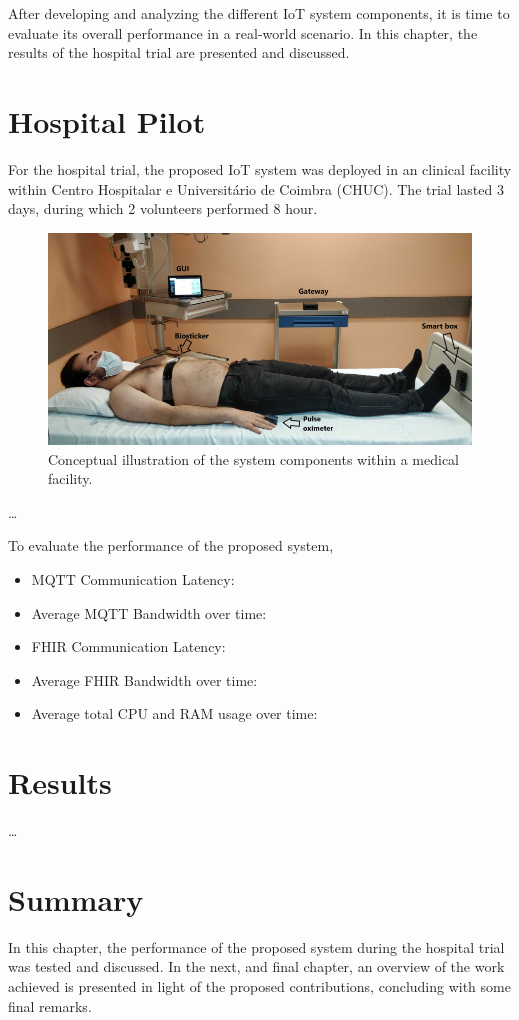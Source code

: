 After developing and analyzing the different \acs{IoT} system components, it is time to evaluate its overall performance in a real-world scenario. In this chapter, the results of the hospital trial are presented and discussed. 

\section{Hospital Pilot}

For the hospital trial, the proposed \acs{IoT} system was deployed in an clinical facility within Centro Hospitalar e Universitário de Coimbra (CHUC). The trial lasted 3 days, during which 2 volunteers performed 8 hour. 


\begin{figure}[H]
    \centering
    \includegraphics[width=\linewidth]{images/hospital-trial.png}
    \caption[Conceptual illustration of the system components within a medical facility.]{Conceptual illustration of the system components within a medical facility.}
    \label{fig:hospital-trial}
\end{figure}
\dots

To evaluate the performance of the proposed system, 

\begin{itemize}
    \item \acs{MQTT} Communication Latency:
    \item Average \acs{MQTT} Bandwidth over time: 
    \item \acs{FHIR} Communication Latency:
    \item Average \acs{FHIR} Bandwidth over time: 
    \item Average total CPU and RAM usage over time:
\end{itemize}



\section{Results}
\dots

\section{Summary}
In this chapter, the performance of the proposed system during the hospital trial was tested and discussed. 
In the next, and final chapter, an overview of the work achieved is presented in light of the proposed contributions, concluding with some final remarks.